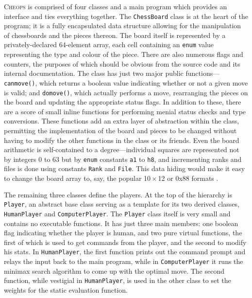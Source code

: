 \documentclass[a4paper]{article}
\begin{document}
\textsc{Cheops} is comprised of four classes and a main program which
provides an interface and ties everything together. The
\texttt{ChessBoard} class is at the heart of the program; it is a
fully encapsulated data structure allowing for the manipulation of
chessboards and the pieces thereon. The board itself is represented by
a privately-declared 64-element array, each cell containing an
\texttt{enum} value representing the type and colour of the piece.
There are also numerous flags and counters, the purposes of which
should be obvious from the source code and its internal documentation.
The class has just two major public
functions---\texttt{can{\textunderscore}move()}, which returns a
boolean value indicating whether or not a given move is valid; and
\texttt{do{\textunderscore}move()}, which actually performs a move,
rearranging the pieces on the board and updating the appropriate
status flags. In addition to these, there are a score of small inline
functions for performing menial status checks and type conversions.
These functions add an extra layer of abstraction within the class,
permitting the implementation of the board and pieces to be changed
without having to modify the other functions in the class or its
friends. Even the board arithmetic is self-contained to a
degree---individual squares are represented not by integers 0 to 63
but by \texttt{enum} constants \texttt{a1} to \texttt{h8}, and
incrementing ranks and files is done using constants \texttt{Rank} and
\texttt{File}. This data hiding would make it easy to change the board
array to, say, the popular 10\,$\times$\,12 or 0x88 formats
\cite{eppstein}.

The remaining three classes define the players. At the top of the
hierarchy is \texttt{Player}, an abstract base class serving as a
template for its two derived classes, \texttt{HumanPlayer} and
\texttt{ComputerPlayer}.  The \texttt{Player} class itself is very
small and contains no executable functions. It has just three main
members: one boolean flag indicating whether the player is human, and
two pure virtual functions, the first of which is used to get commands
from the player, and the second to modify his stats. In
\texttt{HumanPlayer}, the first function prints out the command prompt
and relays the input back to the main program, while in
\texttt{ComputerPlayer} it runs the minimax search algorithm to come
up with the optimal move.  The second function, while vestigial in
\texttt{HumanPlayer}, is used in the other class to set the weights
for the static evaluation function.
\end{document}
